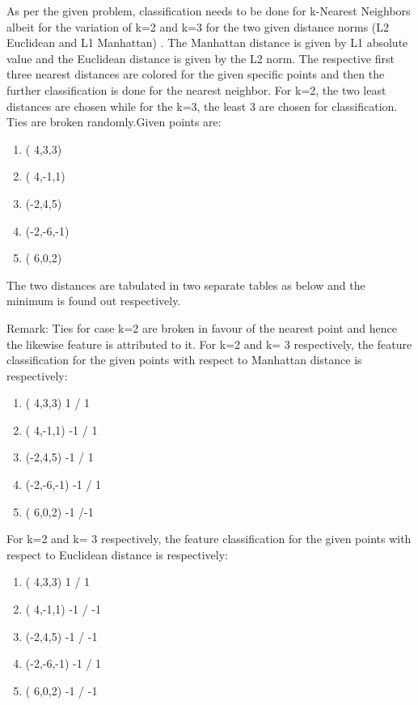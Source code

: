 

As per the given problem, classification needs to be done for k-Nearest Neighbors albeit for the variation of k=2 and k=3 for the two given distance norms (L2 Euclidean and L1 Manhattan) . The Manhattan distance is given by L1 absolute value and the Euclidean distance is given by the L2 norm.
 The respective first three nearest distances are colored for the given specific points and then the further classification is done for the nearest neighbor. For k=2, the two least distances are chosen while for the k=3, the least 3 are chosen for classification. Ties are broken randomly.Given points are:
\begin {enumerate}
	\item( 4,3,3)   
	\item( 4,-1,1)  
	\item(-2,4,5)   
	\item(-2,-6,-1) 
	\item( 6,0,2)  
\end {enumerate}
The two distances are tabulated in two separate tables as below and the minimum is found out respectively.


Remark: Ties for case k=2 are broken in favour of the nearest point and hence the likewise feature is attributed to it.
For k=2 and k= 3 respectively, the feature classification for the given points with respect to Manhattan distance is respectively:
\begin {enumerate}
	\item( 4,3,3)      1 / 1
	\item( 4,-1,1)    -1 / 1
	\item(-2,4,5)     -1 / 1
	\item(-2,-6,-1)   -1 / 1
	\item( 6,0,2)     -1 /-1
\end {enumerate}
For k=2 and k= 3 respectively, the feature classification for the given points with respect to Euclidean distance is respectively:
\begin {enumerate}
	\item( 4,3,3)     1 /  1
	\item( 4,-1,1)   -1 / -1
	\item(-2,4,5)    -1 / -1
	\item(-2,-6,-1)  -1 /  1
	\item( 6,0,2)    -1 / -1
\end {enumerate}
